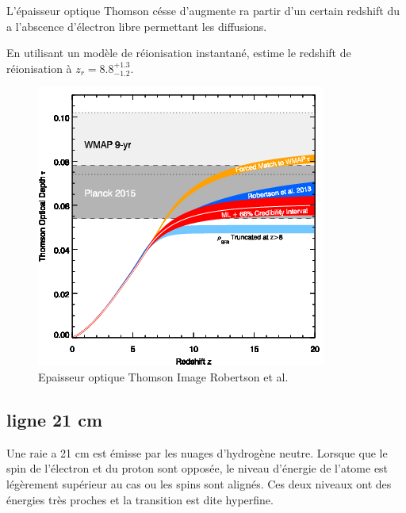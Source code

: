 L'épaisseur optique Thomson césse d'augmente ra partir d'un certain redshift du a l'abscence d'électron libre permettant les diffusions.



En utilisant un modèle de réionisation instantané, \cite{planck_collaboration_planck_2016} estime le redshift de réionisation à $z_r = 8.8 ^{+1.3}_{-1.2}$.

\begin{figure}[bth]
        \includegraphics[width=.95\linewidth]{img/01/epaisseur_optique_thomson.png} 
        \caption{%
		Epaisseur optique Thomson
        Image Robertson et al.}
 		\label{fig:epaisseur_optique_thomson}
\end{figure}




\subsection{ligne 21 cm}

Une raie a 21 cm est émisse par les nuages d'hydrogène neutre.
Lorsque que le spin de l'électron et du proton sont opposée, le niveau d'énergie de l'atome est légèrement supérieur au cas ou les spins sont alignés.
Ces deux niveaux ont des énergies très proches et la transition est dite hyperfine.





